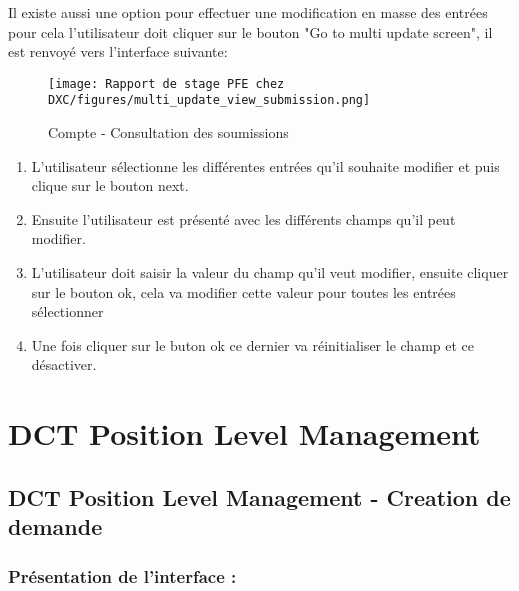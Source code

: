 Il existe aussi une option pour effectuer une modification en masse des entrées pour cela l'utilisateur doit cliquer sur le bouton "Go to multi update screen", il est renvoyé vers l'interface suivante:

\begin{figure}[H]
    \centering
    \texttt{[image: Rapport de stage PFE chez DXC/figures/multi\_update\_view\_submission.png]}
    \caption{Compte - Consultation des soumissions}
\end{figure}

\begin{enumerate}
    
    \item L'utilisateur sélectionne les différentes entrées qu'il souhaite modifier et puis clique sur le bouton next.
    \vspace{0.1cm}
    \item Ensuite l'utilisateur est présenté avec les différents champs qu'il peut modifier.
    \vspace{0.1cm}
    \item L'utilisateur doit saisir la valeur du champ qu'il veut modifier, ensuite cliquer sur le bouton ok, cela va modifier cette valeur pour toutes les entrées sélectionner
    \vspace{0.1cm}
    \item Une fois cliquer sur le buton ok ce dernier va réinitialiser le champ et ce désactiver.

\end{enumerate}


\section{DCT Position Level Management}


\subsection{DCT Position Level Management - Creation de demande}

\subsubsection{Présentation de l'interface :}

